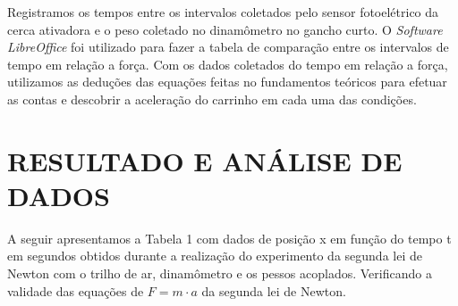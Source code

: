 \documentclass[article,12pt,oneside,a4paper,brazil]{abntex2}
\begin{document}
	Registramos os tempos entre os intervalos coletados pelo sensor fotoelétrico da cerca ativadora e o peso coletado no dinamômetro no gancho curto. O \textit{Software LibreOffice} foi utilizado para fazer a tabela de comparação entre os intervalos de tempo em relação a força. Com os dados coletados do tempo em relação a força, utilizamos as deduções das equações feitas no fundamentos teóricos para efetuar as contas e descobrir a aceleração do carrinho em cada uma das condições.
	
	\section{RESULTADO E ANÁLISE DE DADOS}
	A seguir apresentamos a Tabela 1 com dados de posição x em função do tempo t em
	segundos obtidos durante a realização do experimento da segunda lei de Newton com o trilho de ar, dinamômetro e os pessos acoplados. Verificando a validade das equações de $F=m \cdot a$ da segunda lei de Newton.
	
\end{document}
